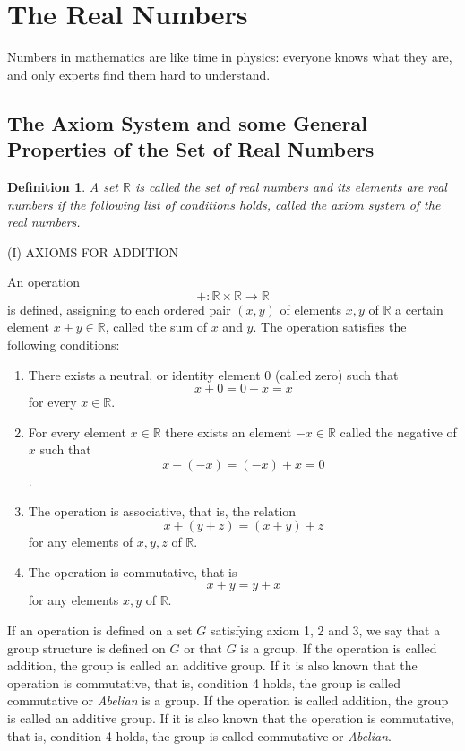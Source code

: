 \documentclass[a4paper,12pt]{article} %
\newtheorem{definition}{Definition}[section]
\begin{document}
\section{The Real Numbers}
Numbers in mathematics are like time in physics: everyone knows what 
they are, and only experts find them hard to understand.
\subsection{The Axiom System and some General Properties of the 
Set of Real Numbers}
\begin{definition} {A set $\mathbb{R}$ is called the set of \textit{real numbers}
and its elements are \textit{real numbers} if the following list of conditions
holds, called the axiom system of the real numbers.}
\end{definition}

\begin{center}
    (I) AXIOMS FOR ADDITION
\end{center}
An operation 
\[+:\mathbb{R}\times\mathbb{R} \to \mathbb{R}\]
is defined, assigning to each ordered pair $(x,y)$ of elements 
$x,y$ of $\mathbb{R}$ a certain element $x+y\in\mathbb{R}$, called 
the sum of $x$ and $y$. The operation satisfies the following 
conditions:
\begin{enumerate}
    \item There exists a neutral, or identity element 0 
        (called zero) such that 
    \[x+0=0+x=x\]
    for every $x\in\mathbb{R}$.
    \item For every element $x\in \mathbb{R}$ there exists an element 
    $-x\in\mathbb{R}$ called the negative of $x$ such that
        \[x+(-x)=(-x)+x=0\].
    \item The operation is associative, that is, the relation
        \[x+(y+z) = (x+y)+z\] for any elements of $x,y,z$ of $\mathbb{R}$.
    \item The operation is commutative, that is 
        \[x+y=y+x\] for any elements $x,y$ of $\mathbb{R}$.
\end{enumerate}

If an operation is defined on a set $G$ satisfying axiom 1, 2 and 3, we
say that a group structure is defined on $G$ or that $G$ is a group. 
If the operation is called addition, the group is called an additive 
group. If it is also known that the operation is commutative, that is, 
condition 4 holds, the group is called commutative or \textit{Abelian} is a group. 
If the operation is called addition, the group is called an additive 
group. If it is also known that the operation is commutative, that is, 
condition 4 holds, the group is called commutative or \textit{Abelian}.
\end{document}
